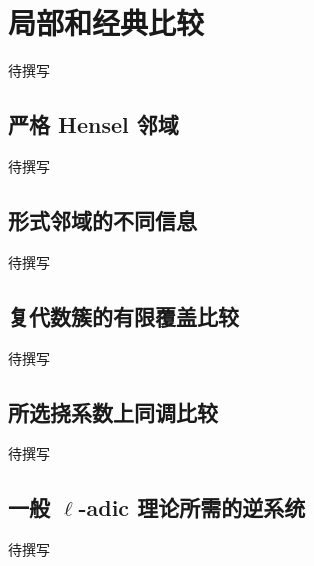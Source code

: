 
% 
% 
% 
% 
% 
% 

\section{局部和经典比较}
\label{g5:sec:3504}

待撰写

\subsection{严格 Hensel 邻域}
\label{g5:subsec:3504:01}
待撰写

\subsection{形式邻域的不同信息}
\label{g5:subsec:3504:02}
待撰写

\subsection{复代数簇的有限覆盖比较}
\label{g5:subsec:3504:03}
待撰写

\subsection{所选挠系数上同调比较}
\label{g5:subsec:3504:04}
待撰写

\subsection{\texorpdfstring{一般 \(\ell\)-adic 理论所需的逆系统}{一般 \GeometryPdfEll{}-adic 理论所需的逆系统}}
\label{g5:subsec:3504:05}
待撰写

